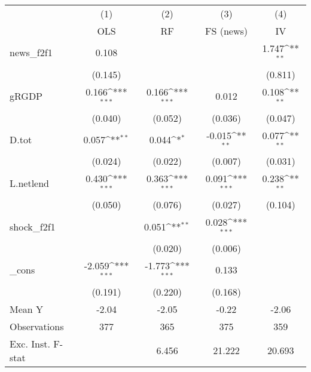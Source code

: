 {
\def\sym#1{\ifmmode^{#1}\else\(^{#1}\)\fi}
\begin{tabular}{l*{4}{c}}
\toprule
            &\multicolumn{1}{c}{(1)}&\multicolumn{1}{c}{(2)}&\multicolumn{1}{c}{(3)}&\multicolumn{1}{c}{(4)}\\
            &\multicolumn{1}{c}{OLS}&\multicolumn{1}{c}{RF}&\multicolumn{1}{c}{FS (news)}&\multicolumn{1}{c}{IV}\\
\midrule
news\_f2f1   &       0.108         &                     &                     &       1.747\sym{**} \\
            &     (0.145)         &                     &                     &     (0.811)         \\
\addlinespace
gRGDP       &       0.166\sym{***}&       0.166\sym{***}&       0.012         &       0.108\sym{**} \\
            &     (0.040)         &     (0.052)         &     (0.036)         &     (0.047)         \\
\addlinespace
D.tot       &       0.057\sym{**} &       0.044\sym{*}  &      -0.015\sym{**} &       0.077\sym{**} \\
            &     (0.024)         &     (0.022)         &     (0.007)         &     (0.031)         \\
\addlinespace
L.netlend   &       0.430\sym{***}&       0.363\sym{***}&       0.091\sym{***}&       0.238\sym{**} \\
            &     (0.050)         &     (0.076)         &     (0.027)         &     (0.104)         \\
\addlinespace
shock\_f2f1  &                     &       0.051\sym{**} &       0.028\sym{***}&                     \\
            &                     &     (0.020)         &     (0.006)         &                     \\
\addlinespace
\_cons      &      -2.059\sym{***}&      -1.773\sym{***}&       0.133         &                     \\
            &     (0.191)         &     (0.220)         &     (0.168)         &                     \\
\midrule
Mean Y      &       -2.04         &       -2.05         &       -0.22         &       -2.06         \\
Observations&         377         &         365         &         375         &         359         \\
Exc. Inst. F-stat&                     &       6.456         &      21.222         &      20.693         \\
\bottomrule
\end{tabular}
}
